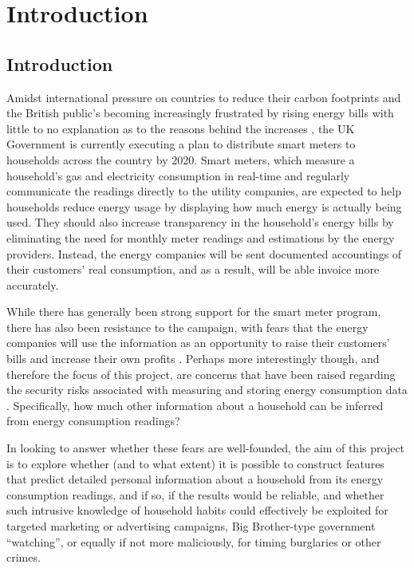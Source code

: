 \chapter{Introduction}
\section{Introduction}
Amidst international pressure on countries to reduce their carbon footprints \cite{E-comm} and the British public's becoming increasingly frustrated by rising energy bills with little to no explanation as to the reasons behind the increases \cite{E-spending}, the UK Government is currently executing a plan to distribute smart meters to households across the country by 2020. Smart meters, which measure a household's gas and electricity consumption in real-time and regularly communicate the readings  directly to the utility companies, are expected to help households reduce energy usage by displaying how much energy is actually being used. They should also increase transparency in the household's energy bills by eliminating the need for monthly meter readings and estimations by the energy providers. Instead, the energy companies will be sent documented accountings of their customers' real consumption, and as a result, will be able invoice more accurately.

While there has generally been strong support for the smart meter program, there has also been resistance to the campaign, with fears that the energy companies will use the information as an opportunity to raise their customers' bills and increase their own profits \cite{stop}. Perhaps more interestingly though, and therefore the focus of this project, are concerns that have been raised regarding the security risks associated with measuring and storing energy consumption data \cite{Quinn} \cite{LMW}. Specifically, how much other information about a household can be inferred from energy consumption readings? 

In looking to answer whether these fears are well-founded, the aim of this project is to explore whether (and to what extent) it is
possible to construct features that predict detailed personal information about a household from its energy consumption readings, and if so, if the results would be reliable, and whether such intrusive knowledge of household habits could effectively be exploited for targeted marketing or advertising campaigns, Big Brother-type government “watching”, or equally if not more maliciously, for timing burglaries or other crimes. 

